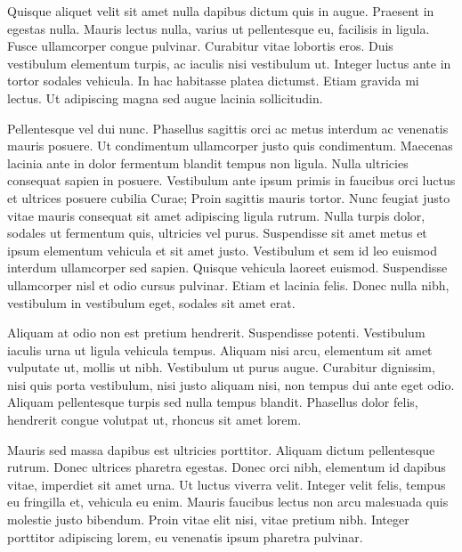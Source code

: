 \documentclass[twoside]{ritsi/report}
\begin{document}
Quisque aliquet velit sit amet nulla dapibus dictum quis in augue. Praesent in egestas nulla. Mauris lectus nulla, varius ut pellentesque eu, facilisis in ligula. Fusce ullamcorper congue pulvinar. Curabitur vitae lobortis eros. Duis vestibulum elementum turpis, ac iaculis nisi vestibulum ut. Integer luctus ante in tortor sodales vehicula. In hac habitasse platea dictumst. Etiam gravida mi lectus. Ut adipiscing magna sed augue lacinia sollicitudin.

Pellentesque vel dui nunc. Phasellus sagittis orci ac metus interdum ac venenatis mauris posuere. Ut condimentum ullamcorper justo quis condimentum. Maecenas lacinia ante in dolor fermentum blandit tempus non ligula. Nulla ultricies consequat sapien in posuere. Vestibulum ante ipsum primis in faucibus orci luctus et ultrices posuere cubilia Curae; Proin sagittis mauris tortor. Nunc feugiat justo vitae mauris consequat sit amet adipiscing ligula rutrum. Nulla turpis dolor, sodales ut fermentum quis, ultricies vel purus. Suspendisse sit amet metus et ipsum elementum vehicula et sit amet justo. Vestibulum et sem id leo euismod interdum ullamcorper sed sapien. Quisque vehicula laoreet euismod. Suspendisse ullamcorper nisl et odio cursus pulvinar. Etiam et lacinia felis. Donec nulla nibh, vestibulum in vestibulum eget, sodales sit amet erat.

Aliquam at odio non est pretium hendrerit. Suspendisse potenti. Vestibulum iaculis urna ut ligula vehicula tempus. Aliquam nisi arcu, elementum sit amet vulputate ut, mollis ut nibh. Vestibulum ut purus augue. Curabitur dignissim, nisi quis porta vestibulum, nisi justo aliquam nisi, non tempus dui ante eget odio. Aliquam pellentesque turpis sed nulla tempus blandit. Phasellus dolor felis, hendrerit congue volutpat ut, rhoncus sit amet lorem.

Mauris sed massa dapibus est ultricies porttitor. Aliquam dictum pellentesque rutrum. Donec ultrices pharetra egestas. Donec orci nibh, elementum id dapibus vitae, imperdiet sit amet urna. Ut luctus viverra velit. Integer velit felis, tempus eu fringilla et, vehicula eu enim. Mauris faucibus lectus non arcu malesuada quis molestie justo bibendum. Proin vitae elit nisi, vitae pretium nibh. Integer porttitor adipiscing lorem, eu venenatis ipsum pharetra pulvinar.
\end{document}
